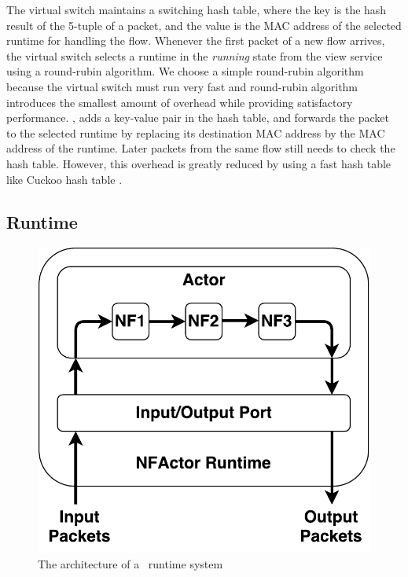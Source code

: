 The virtual switch maintains a switching hash table, where the key is the hash result of the 5-tuple of a packet,
and the value is the MAC address of the selected runtime for handling the flow. Whenever the first packet of a new flow arrives, the virtual switch
selects a runtime in the \textit{running} state from the view service using
a round-rubin algorithm. We choose a simple round-rubin algorithm because the virtual switch must run very fast and round-rubin algorithm introduces the smallest amount of overhead while providing satisfactory performance. %
, adds a key-value pair in the hash table, and forwards the packet to the selected runtime by replacing its destination MAC address by the MAC address of the runtime. Later packets from the same flow still needs to check the hash table. However, this overhead is greatly reduced by using a fast hash table like Cuckoo hash table \cite{zhou2013scalable}. %

\subsection{Runtime}
\label{sec:runtime}

\begin{figure}[!h]
        \centering
        \includegraphics[width=0.6\columnwidth]{figure/NFActor-Runtime.pdf}
        \caption{The architecture of a \nfactor~runtime system}
        \label{fig:nfactor-runtime}
\end{figure} 


